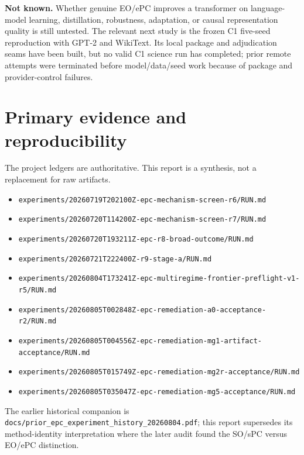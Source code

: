 \documentclass[10pt,a4paper]{article}
\begin{document}
\textbf{Not known.} Whether genuine EO/ePC improves a transformer on
language-model learning, distillation, robustness, adaptation, or causal
representation quality is still untested.  The relevant next study is the
frozen C1 five-seed reproduction with GPT-2 and WikiText.  Its local package
and adjudication seams have been built, but no valid C1 science run has
completed; prior remote attempts were terminated before model/data/seed work
because of package and provider-control failures.

\section*{Primary evidence and reproducibility}
The project ledgers are authoritative.  This report is a synthesis, not a
replacement for raw artifacts.
\begin{itemize}
\item \texttt{experiments/20260719T202100Z-epc-mechanism-screen-r6/RUN.md}
\item \texttt{experiments/20260720T114200Z-epc-mechanism-screen-r7/RUN.md}
\item \texttt{experiments/20260720T193211Z-epc-r8-broad-outcome/RUN.md}
\item \texttt{experiments/20260721T222400Z-r9-stage-a/RUN.md}
\item \texttt{experiments/20260804T173241Z-epc-multiregime-frontier-preflight-v1-r5/RUN.md}
\item \texttt{experiments/20260805T002848Z-epc-remediation-a0-acceptance-r2/RUN.md}
\item \texttt{experiments/20260805T004556Z-epc-remediation-mg1-artifact-acceptance/RUN.md}
\item \texttt{experiments/20260805T015749Z-epc-remediation-mg2r-acceptance/RUN.md}
\item \texttt{experiments/20260805T035047Z-epc-remediation-mg5-acceptance/RUN.md}
\end{itemize}
The earlier historical companion is
\texttt{docs/prior\_epc\_experiment\_history\_20260804.pdf}; this report
supersedes its method-identity interpretation where the later audit found the
SO/sPC versus EO/ePC distinction.
\end{document}
